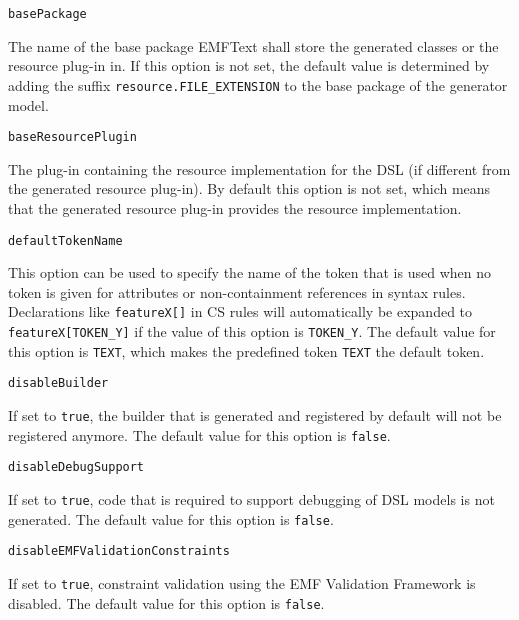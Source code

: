 \noindent\texttt{basePackage}
\begin{myindentpar}{1cm}
The name of the base package EMFText shall store the generated classes or the resource plug-in in. If this option is not set, the default value is determined by adding the suffix \texttt{resource.FILE\_EXTENSION} to the base package of the generator model.
\end{myindentpar}

\noindent\texttt{baseResourcePlugin}
\begin{myindentpar}{1cm}
The plug-in containing the resource implementation for the DSL (if different from the generated resource plug-in). By default this option is not set, which means that the generated resource plug-in provides the resource implementation.
\end{myindentpar}

\noindent\texttt{defaultTokenName}
\begin{myindentpar}{1cm}
This option can be used to specify the name of the token that is used when no token is given for attributes or non-containment references in syntax rules. Declarations like \texttt{featureX[]} in CS rules will automatically be expanded to \texttt{featureX[TOKEN\_Y]} if the value of this option is \texttt{TOKEN\_Y}. The default value for this option is \texttt{TEXT}, which makes the predefined token \texttt{TEXT} the default token.
\end{myindentpar}

\noindent\texttt{disableBuilder}
\begin{myindentpar}{1cm}
If set to \texttt{true}, the builder that is generated and registered by default will not be registered anymore. The default value for this option is \texttt{false}.
\end{myindentpar}

\noindent\texttt{disableDebugSupport}
\begin{myindentpar}{1cm}
If set to \texttt{true}, code that is required to support debugging of DSL models is not generated. The default value for this option is \texttt{false}.
\end{myindentpar}

\noindent\texttt{disableEMFValidationConstraints}
\begin{myindentpar}{1cm}
If set to \texttt{true}, constraint validation using the EMF Validation Framework is disabled. The default value for this option is \texttt{false}.
\end{myindentpar}

